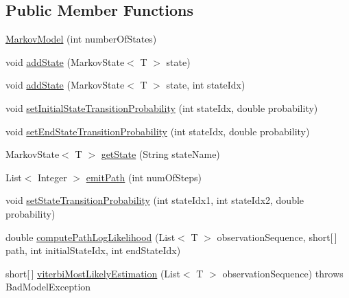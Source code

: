 \subsection*{Public Member Functions}
\begin{DoxyCompactItemize}
\item 
\hyperlink{classbroad_1_1core_1_1hmm_1_1_markov_model_3_01_t_01_4_a079c48f25bf7da1f0aaf770c33c8165f}{Markov\+Model} (int number\+Of\+States)
\item 
void \hyperlink{classbroad_1_1core_1_1hmm_1_1_markov_model_3_01_t_01_4_a47f46d3ae21c57f50a89306d17bd7aae}{add\+State} (Markov\+State$<$ T $>$ state)
\item 
void \hyperlink{classbroad_1_1core_1_1hmm_1_1_markov_model_3_01_t_01_4_a0fe7960bc081b993ecef81cc7cfd14fc}{add\+State} (Markov\+State$<$ T $>$ state, int state\+Idx)
\item 
void \hyperlink{classbroad_1_1core_1_1hmm_1_1_markov_model_3_01_t_01_4_aba503eb5544b223a0d59735dce22d352}{set\+Initial\+State\+Transition\+Probability} (int state\+Idx, double probability)
\item 
void \hyperlink{classbroad_1_1core_1_1hmm_1_1_markov_model_3_01_t_01_4_ae791de048edf2805a41b0ecbefcad618}{set\+End\+State\+Transition\+Probability} (int state\+Idx, double probability)
\item 
Markov\+State$<$ T $>$ \hyperlink{classbroad_1_1core_1_1hmm_1_1_markov_model_3_01_t_01_4_a3965e6fcde1614cb752ea55f1ed345b1}{get\+State} (String state\+Name)
\item 
List$<$ Integer $>$ \hyperlink{classbroad_1_1core_1_1hmm_1_1_markov_model_3_01_t_01_4_ac49b035ccf3ecfd2b02a87f27e251180}{emit\+Path} (int num\+Of\+Steps)
\item 
void \hyperlink{classbroad_1_1core_1_1hmm_1_1_markov_model_3_01_t_01_4_aa8ed4512f906c463dfaf7278cb55a847}{set\+State\+Transition\+Probability} (int state\+Idx1, int state\+Idx2, double probability)
\item 
double \hyperlink{classbroad_1_1core_1_1hmm_1_1_markov_model_3_01_t_01_4_ab9e4009415f48fb35892f39e73544237}{compute\+Path\+Log\+Likelihood} (List$<$ T $>$ observation\+Sequence, short\mbox{[}$\,$\mbox{]} path, int initial\+State\+Idx, int end\+State\+Idx)
\item 
short\mbox{[}$\,$\mbox{]} \hyperlink{classbroad_1_1core_1_1hmm_1_1_markov_model_3_01_t_01_4_a7ef96f6f074232f1c412330f5e314dfc}{viterbi\+Most\+Likely\+Estimation} (List$<$ T $>$ observation\+Sequence)  throws Bad\+Model\+Exception 
\item 

\end{DoxyCompactItemize}
